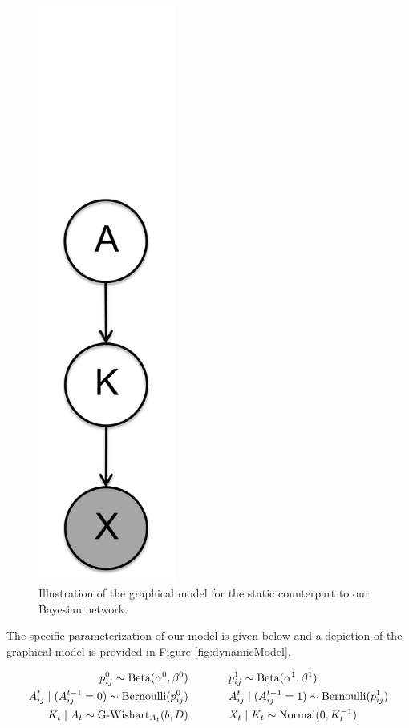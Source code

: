 \documentclass{article}
\begin{document}
\begin{figure}[tbp]
\begin{minipage}[c]{0.24\linewidth}
      \includegraphics[width=0.4\textwidth]{fig/static_ggm_model.png}
      \caption{Illustration of the graphical model for the static counterpart to our Bayesian network.}
      \label{fig:staticModel}
  \end{minipage}
\end{figure}

The specific parameterization of our model is given below and a depiction of the graphical model is provided in Figure \ref{fig:dynamicModel}.

\begin{align*}
p_{ij}^0 \sim \text{Beta}(\alpha^0,\beta^0) &\hspace{.5in} p_{ij}^1 \sim \text{Beta}(\alpha^1,\beta^1) \\
A_{ij}^t \mid (A_{ij}^{t-1} = 0) \sim \text{Bernoulli}(p_{ij}^0) &\hspace{.5in} A_{ij}^t \mid (A_{ij}^{t-1} = 1) \sim \text{Bernoulli}(p_{ij}^1) \\
K_t \mid A_t \sim \text{G-Wishart}_{A_t}(b,D) &\hspace{.5in} X_t \mid K_t \sim \text{Normal}(0,K_t^{-1})
\end{align*}
\end{document}
